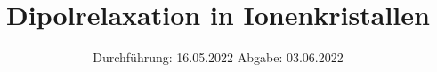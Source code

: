 

\subject{Versuch Nr.V48}
\title{Dipolrelaxation in Ionenkristallen}
\date{%
  Durchführung: 16.05.2022
  \hspace{3em}
  Abgabe: 03.06.2022
}



\maketitle
\thispagestyle{empty}
\tableofcontents
\newpage 








\nocite{*}

\printbibliography{}


